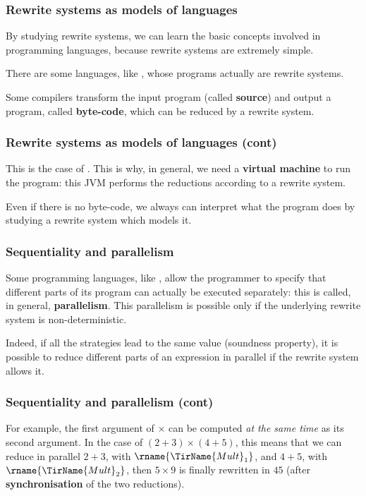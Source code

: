 %
\begin{frame}
\frametitle{Rewrite systems as models of languages}

By studying rewrite systems, we can learn the basic concepts involved
in programming languages, because rewrite systems are extremely
simple.

\bigskip

There are some languages, like \Maude, whose programs actually are
rewrite systems.

\bigskip

Some compilers transform the input program (called \textbf{source})
and output a program, called \textbf{byte-code}, which can be
reduced by a rewrite system.

\end{frame}

%
\begin{frame}
\frametitle{Rewrite systems as models of languages (cont)}

This is the case of \Java. This is why, in general, we need a
\textbf{\Java virtual machine} to run the program: this JVM performs
the reductions according to a rewrite system.

\bigskip

Even if there is no byte-code, we always can interpret what the
program does by studying a rewrite system which models it. 

\end{frame}

%
\begin{frame}
\frametitle{Sequentiality and parallelism}

Some programming languages, like \Ada, allow the programmer to specify
that different parts of its program can actually be executed
separately: this is called, in general, \textbf{parallelism}. This
parallelism is possible only if the underlying rewrite system is
non-deterministic.

\bigskip

Indeed, if all the strategies lead to the same value (soundness
property), it is possible to reduce different parts of an expression
in parallel if the rewrite system allows it.

\end{frame}

%
\begin{frame}
\frametitle{Sequentiality and parallelism (cont)}

For example, the first argument of \(\times\) can be computed \emph{at
  the same time} as its second argument. In the case of \((2+3) \times
(4+5)\), this means that we can reduce in parallel \(2+3\), with
\(\rname{\TirName{Mult}_1}\), and \(4+5\), with
\(\rname{\TirName{Mult}_2}\), then \(5 \times 9\) is finally rewritten
in \(45\) (after \textbf{synchronisation} of the two reductions).

\end{frame}
